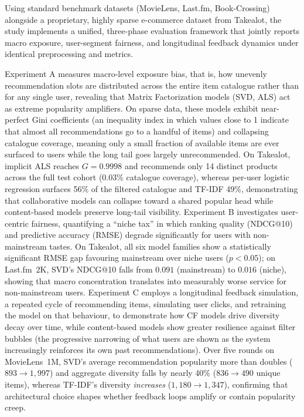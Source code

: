 \documentclass[11pt,a4paper]{report}
\begin{document}
Using standard benchmark datasets (MovieLens, Last.fm, Book-Crossing) alongside a proprietary, highly sparse e-commerce dataset from Takealot, the study implements a unified, three-phase evaluation framework that jointly reports macro exposure, user-segment fairness, and longitudinal feedback dynamics under identical preprocessing and metrics.

Experiment A measures macro-level exposure bias, that is, how unevenly recommendation slots are distributed across the entire item catalogue rather than for any single user, revealing that Matrix Factorization models (SVD, ALS) act as extreme popularity amplifiers. On sparse data, these models exhibit near-perfect Gini coefficients (an inequality index in which values close to 1 indicate that almost all recommendations go to a handful of items) and collapsing catalogue coverage, meaning only a small fraction of available items are ever surfaced to users while the long tail goes largely unrecommended. On Takealot, implicit ALS reaches $G = 0.9998$ and recommends only 14 distinct products across the full test cohort ($0.03\%$ catalogue coverage), whereas per-user logistic regression surfaces 56\% of the filtered catalogue and TF-IDF 49\%, demonstrating that collaborative models can collapse toward a shared popular head while content-based models preserve long-tail visibility. Experiment B investigates user-centric fairness, quantifying a ``niche tax'' in which ranking quality (NDCG@10) and predictive accuracy (RMSE) degrade significantly for users with non-mainstream tastes. On Takealot, all six model families show a statistically significant RMSE gap favouring mainstream over niche users ($p < 0.05$); on Last.fm~2K, SVD's NDCG@10 falls from $0.091$ (mainstream) to $0.016$ (niche), showing that macro concentration translates into measurably worse service for non-mainstream users. Experiment C employs a longitudinal feedback simulation, a repeated cycle of recommending items, simulating user clicks, and retraining the model on that behaviour, to demonstrate how CF models drive diversity decay over time, while content-based models show greater resilience against filter bubbles (the progressive narrowing of what users are shown as the system increasingly reinforces its own past recommendations). Over five rounds on MovieLens~1M, SVD's average recommendation popularity more than doubles ($893 \rightarrow 1{,}997$) and aggregate diversity falls by nearly 40\% ($836 \rightarrow 490$ unique items), whereas TF-IDF's diversity \emph{increases} ($1{,}180 \rightarrow 1{,}347$), confirming that architectural choice shapes whether feedback loops amplify or contain popularity creep.
\end{document}
